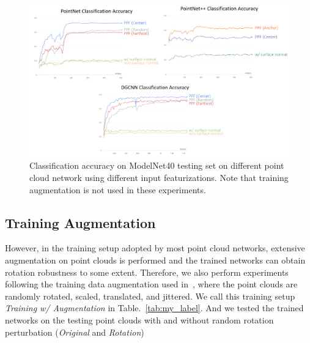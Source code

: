 \documentclass{article}
\begin{document}
\begin{figure}[ht!]
    \centering
    \includegraphics[width=\textwidth]{images/ppf_combined.png}
\caption{Classification accuracy on ModelNet40 testing set on different point cloud network using different input featurizations. Note that training augmentation is not used in these experiments. }
\end{figure}

\subsection{Training Augmentation}

However, in the training setup adopted by most point cloud networks, extensive augmentation on point clouds is performed and the trained networks can obtain rotation robustness to some extent. 
Therefore, we also perform experiments following the training data augmentation used in~\cite{qi2017pointnet2}, where the point clouds are randomly rotated, scaled, translated, and jittered. We call this training setup \textit{Training w/ Augmentation} in Table.~\ref{tab:my_label}. And we tested the trained networks on the testing point clouds with and without random rotation perturbation (\textit{Original} and \textit{Rotation})
\end{document}
